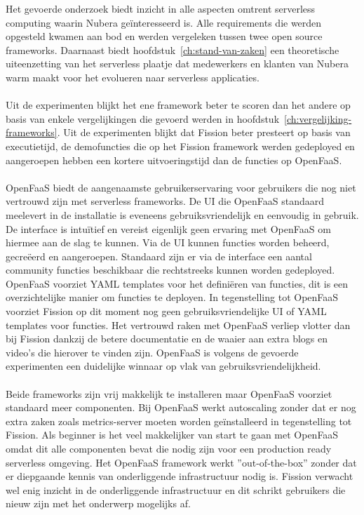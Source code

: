 Het gevoerde onderzoek biedt inzicht in alle aspecten omtrent serverless computing waarin Nubera geïnteresseerd is. Alle requirements die werden opgesteld kwamen aan bod en werden vergeleken tussen twee open source frameworks. Daarnaast biedt hoofdstuk~\ref{ch:stand-van-zaken} een theoretische uiteenzetting van het serverless plaatje dat medewerkers en klanten van Nubera warm maakt voor het evolueren naar serverless applicaties.
\\\\
Uit de experimenten blijkt het ene framework beter te scoren dan het andere op basis van enkele vergelijkingen die gevoerd werden in hoofdstuk~\ref{ch:vergelijking-frameworks}. Uit de experimenten blijkt dat Fission beter presteert op basis van executietijd, de demofuncties die op het Fission framework werden gedeployed en aangeroepen hebben een kortere uitvoeringstijd dan de functies op OpenFaaS.
\\\\
OpenFaaS biedt de aangenaamste gebruikerservaring voor gebruikers die nog niet vertrouwd zijn met serverless frameworks. De UI die OpenFaaS standaard meelevert in de installatie is eveneens gebruiksvriendelijk en eenvoudig in gebruik. De interface is intuïtief en vereist eigenlijk geen ervaring met OpenFaaS om hiermee aan de slag te kunnen. Via de UI kunnen functies worden beheerd, gecreëerd en aangeroepen. Standaard zijn er via de interface een aantal community functies beschikbaar die rechtstreeks kunnen worden gedeployed. OpenFaaS voorziet YAML templates voor het definiëren van functies, dit is een overzichtelijke manier om functies te deployen. In tegenstelling tot OpenFaaS voorziet Fission op dit moment nog geen gebruiksvriendelijke UI of YAML templates voor functies. Het vertrouwd raken met OpenFaaS verliep vlotter dan bij Fission dankzij de betere documentatie en de waaier aan extra blogs en video's die hierover te vinden zijn. OpenFaaS is volgens de gevoerde experimenten een duidelijke winnaar op vlak van gebruiksvriendelijkheid. 
\\\\
Beide frameworks zijn vrij makkelijk te installeren maar OpenFaaS voorziet standaard meer componenten. Bij OpenFaaS werkt autoscaling zonder dat er nog extra zaken zoals metrics-server moeten worden geïnstalleerd in tegenstelling tot Fission. Als beginner is het veel makkelijker van start te gaan met OpenFaaS omdat dit alle componenten bevat die nodig zijn voor een production ready serverless omgeving. Het OpenFaaS framework werkt ''out-of-the-box'' zonder dat er diepgaande kennis van onderliggende infrastructuur nodig is. Fission verwacht wel enig inzicht in de onderliggende infrastructuur en dit schrikt gebruikers die nieuw zijn met het onderwerp mogelijks af.
